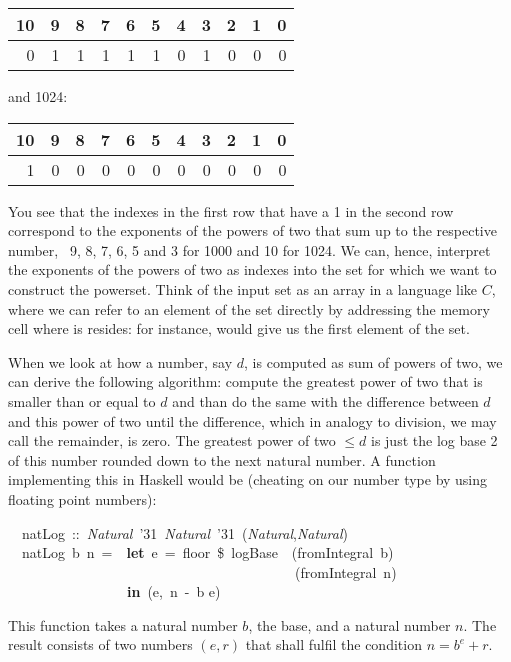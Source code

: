 \documentclass{scrreprt}
\newcommand{\texfamily}{\fontfamily{cmtex}\selectfont}
\begin{document}
\begin{tabular}{ r r r r r r r r r r r}
10 & 9 & 8 & 7 & 6 & 5 & 4 & 3 & 2 & 1 & 0\\\hline
 0 & 1 & 1 & 1 & 1 & 1 & 0 & 1 & 0 & 0 & 0
\end{tabular}

and \num{1024}:

\begin{tabular}{ r r r r r r r r r r r}
10 & 9 & 8 & 7 & 6 & 5 & 4 & 3 & 2 & 1 & 0\\\hline
 1 & 0 & 0 & 0 & 0 & 0 & 0 & 0 & 0 & 0 & 0
\end{tabular}

You see that the indexes in the first row
that have a 1 in the second row
correspond to the exponents of the powers
of two that sum up to the respective number,
\ie\ 9, 8, 7, 6, 5 and 3 for \num{1000}
and 10 for \num{1024}.
We can, hence, interpret the exponents of 
the powers of two as indexes into the set
for which we want to construct the powerset.
Think of the input set as an array
in a language like $C$,
where we can refer to an element of the set
directly by addressing the memory cell
where is resides: 
 for instance,
would give us the first element of the set.

When we look at how a number, say $d$, is computed
as sum of powers of two,
we can derive the following algorithm:
compute the greatest power of two
that is smaller than or equal to $d$ 
and than do the same with the difference
between $d$ and this power of two
until the difference,
which in analogy to division,
we may call the remainder,
is zero.
The greatest power of two $\le d$ 
is just the log base 2
of this number rounded down
to the next natural number.
A function implementing this in Haskell
would be (cheating on our number type 
by using floating point numbers):

\begin{tabbing}\texfamily
~~natLog~::~{\itshape Natural}~\char'31~{\itshape Natural}~\char'31~({\itshape Natural},{\itshape Natural})\\
\texfamily ~~natLog~b~n~=~~{\bfseries let}~e~=~floor~\$~logBase~~(fromIntegral~b)\\
\texfamily ~~~~~~~~~~~~~~~~~~~~~~~~~~~~~~~~~~~~~~~~~(fromIntegral~n)\\
\texfamily ~~~~~~~~~~~~~~~~~{\bfseries in}~(e,~n~-~b e)
\end{tabbing}

This function takes a natural number $b$,
the base, and a natural number $n$.
The result consists of 
two numbers $(e,r)$ that
shall fulfil the condition $n = b^e + r$.
\end{document}
